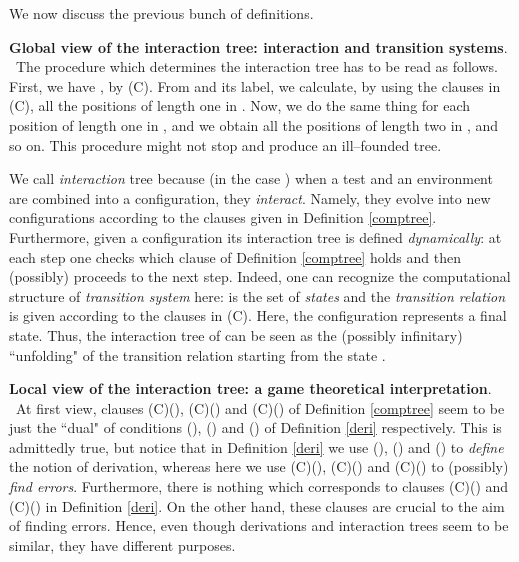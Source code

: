 \documentclass[copyright,creativecommons]{eptcs}
\theoremstyle{definition}
\begin{document}
We now discuss the previous bunch of definitions.\\

\vspace{-0.35cm}

\noindent \textbf{Global view of the interaction tree: interaction and transition systems}. \
The procedure which determines the interaction tree has to be read as follows. First, we have
 , by (C).
From  and its label,
we calculate, by using the clauses in (C), all the positions
of length one in  . Now,
we do the same thing for
each position
of length one
 in , and we  obtain
 all the positions
of length two in , and so on. This procedure might  not stop
and produce an ill--founded tree.



We call     \emph{interaction} tree
because (in the case )
when a test and an environment are combined into a configuration, they \emph{interact}. Namely, they evolve into  new configurations according to
the clauses given in Definition \ref{comptree}.
 Furthermore, given a configuration  its interaction tree  is defined
\emph{dynamically}: at each step one checks which clause
of Definition \ref{comptree} holds and then (possibly) proceeds to the
next step.  Indeed, one
can recognize the computational structure of \emph{transition system}  here: 
is the set of   \emph{states} and
the \emph{transition relation}  is
given according to the clauses
in (C).
Here,   the configuration   represents a final state.
Thus, the interaction tree of  can be seen
 as the (possibly
infinitary) ``unfolding" of the  transition relation  starting from the state  .\\

\vspace{-0.35cm}

\noindent \textbf{Local view of the interaction tree: a game theoretical interpretation}. \
At first view,   clauses (C)(),
(C)() and (C)()
 of Definition \ref{comptree}
seem to be just  the ``dual"  of   conditions
(), () and ()
of
Definition \ref{deri} respectively.
This is admittedly true,  but notice that
in Definition \ref{deri} we use (), () and ()  to \emph{define} the notion of derivation, whereas here
 we use (C)(),
(C)() and (C)() to (possibly) \emph{find errors}. Furthermore,
there is nothing which   corresponds to  clauses
(C)() and (C)() in Definition \ref{deri}. On the other hand,
these clauses are  crucial to the aim of finding errors.
Hence, even though derivations and interaction trees
seem to be similar,
they have  different purposes.
\end{document}
